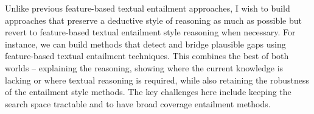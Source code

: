 \documentclass[a4paper,11pt,onecolumn]{article}
\begin{document}
Unlike previous feature-based textual entailment approaches, I wish to build approaches that preserve a deductive style of reasoning as much as possible but revert to feature-based textual entailment style reasoning when necessary. For instance, we can build methods that detect and bridge plausible gaps using feature-based textual entailment techniques. This combines the best of both worlds -- explaining the reasoning, showing where the current knowledge is lacking or where textual reasoning is required, while also retaining the robustness of the entailment style methods. The key challenges here include keeping the search space tractable and to have broad coverage entailment methods. 







\end{document}
